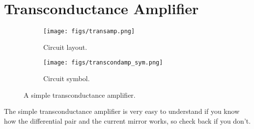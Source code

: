 \documentclass[main]{subfiles}
\begin{document}

\section{Transconductance Amplifier}
\begin{figure}[b]
\begin{subfigure} [b]{0.45\textwidth}
  \centering
  \texttt{[image: figs/transamp.png]}
  \caption{Circuit layout. \cite{lec4}}
  \label{fig:transamp}
\end{subfigure}
	\begin{subfigure} [b]{0.45\textwidth}
	\centering
	\texttt{[image: figs/transcondamp\_sym.png]}
	\caption{Circuit symbol. \cite{lec5}}
	\label{fig:transamp_sym}
	\end{subfigure}
	\label{fig:transamp_all}
	\caption{A simple transconductance amplifier.}
\end{figure}\bigskip

The simple transconductance amplifier is very easy to understand if you know how the differential pair and the current mirror works, so check back if you don't. 
\end{document}
